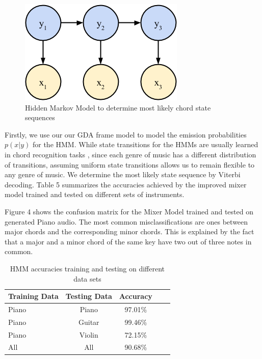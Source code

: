 \documentclass{article}
\begin{document}
\begin{figure}[ht]
\vskip 0.2in
\begin{center}
\centerline{\includegraphics[width=\columnwidth]{hmm}}
\caption{Hidden Markov Model to determine most likely chord state sequences}
\label{icml-historical}
\end{center}
\vskip -0.2in
\end{figure}

Firstly, we use our our GDA frame model to model the emission probabilities $p(x|y)$ for the HMM. While state
transitions for the HMMs are usually learned in chord recognition tasks \cite{lee}, since
each genre of music has a different distribution of transitions, assuming
uniform state transitions allows us to remain flexible to any genre of music. We
determine the most likely state sequence by Viterbi decoding. Table 5
summarizes the accuracies achieved by the improved mixer model trained and tested on
different sets of instruments.

Figure 4 shows the confusion matrix for the Mixer Model trained and tested on generated Piano audio. The most common misclassifications are ones
between major chords and the corresponding minor chords. This is explained by
the fact that a major and a minor chord of the same key have two out of three notes
in common.

\begin{table}[t]
\caption{HMM accuracies training and testing on different data sets}
\label{hmmacc}
\vskip 0.15in
\begin{center}
\begin{small}
\begin{sc}
\begin{tabular}{lcccr}
\hline
\abovespace\belowspace
Training Data & Testing Data & Accuracy \\
\hline
\abovespace
Piano & Piano & 97.01\%\\
Piano & Guitar & 99.46\%\\
Piano & Violin & 72.15\%\\
All & All & 90.68\%\\
\hline
\end{tabular}
\end{sc}
\end{small}
\end{center}
\vskip -0.1in
\end{table}
\end{document}
